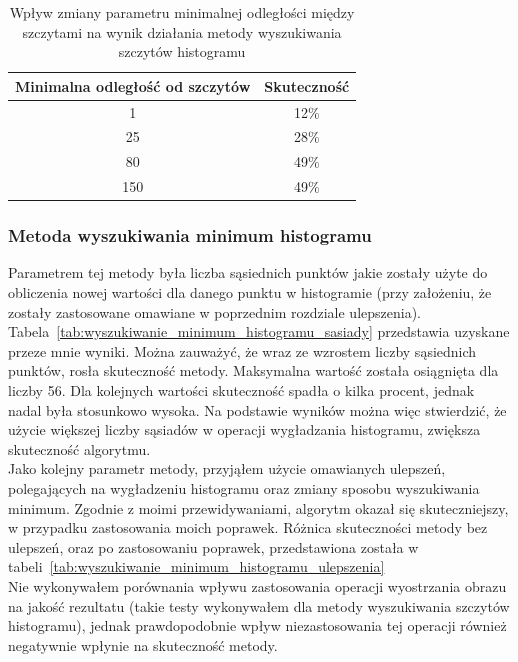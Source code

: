 \begin {table}[H]
  \begin{center}
    \begin{tabular}{c | c}
      Minimalna odległość od szczytów & Skuteczność \\
      \hline
      1 & 12\% \\
      25 & 28\% \\
      80 & 49\% \\
      150 & 49\%
    \end{tabular}
    \caption {Wpływ zmiany parametru minimalnej odległości między szczytami na wynik działania metody wyszukiwania szczytów histogramu}
    \label{tab:wyszukiwanie_szczytow_dystans} 
  \end{center}
\end {table}

\subsubsection{Metoda wyszukiwania minimum histogramu}
Parametrem tej metody była liczba sąsiednich punktów jakie zostały użyte do obliczenia nowej wartości dla danego punktu w histogramie (przy założeniu, że zostały zastosowane omawiane w poprzednim rozdziale ulepszenia). Tabela~\ref{tab:wyszukiwanie_minimum_histogramu_sasiady} przedstawia uzyskane przeze mnie wyniki. Można zauważyć, że wraz ze wzrostem liczby sąsiednich punktów, rosła skuteczność metody. Maksymalna wartość została osiągnięta dla liczby 56. Dla kolejnych wartości skuteczność spadła o kilka procent, jednak nadal była stosunkowo wysoka. Na podstawie wyników można więc stwierdzić, że użycie większej liczby sąsiadów w operacji wygładzania histogramu, zwiększa skuteczność algorytmu. \\
Jako kolejny parametr metody, przyjąłem użycie omawianych ulepszeń, polegających na wygładzeniu histogramu oraz zmiany sposobu wyszukiwania minimum. Zgodnie z moimi przewidywaniami, algorytm okazał się skuteczniejszy, w przypadku zastosowania moich poprawek. Różnica skuteczności metody bez ulepszeń, oraz po zastosowaniu poprawek, przedstawiona została w tabeli~\ref{tab:wyszukiwanie_minimum_histogramu_ulepszenia} \\
Nie wykonywałem porównania wpływu zastosowania operacji wyostrzania obrazu na jakość rezultatu (takie testy wykonywałem dla metody wyszukiwania szczytów histogramu), jednak prawdopodobnie wpływ niezastosowania tej operacji również negatywnie wpłynie na skuteczność metody.



